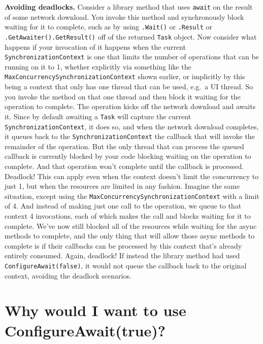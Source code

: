 \documentclass[a4paper,12pt,notitlepage,twoside,openright]{article}
\begin{document}
\textbf{Avoiding deadlocks.} Consider a library method that uses
\texttt{await} on the result of some network download. You invoke this
method and synchronously block waiting for it to complete, such as by
using \texttt{.Wait()} or \texttt{.Result} or
\texttt{.GetAwaiter().GetResult()} off of the returned \texttt{Task}
object. Now consider what happens if your invocation of it happens when
the current \texttt{SynchronizationContext} is one that limits the
number of operations that can be running on it to 1, whether explicitly
via something like the \texttt{MaxConcurrencySynchronizationContext}
shown earlier, or implicitly by this being a context that only has one
thread that can be used, e.g.~a UI thread. So you invoke the method on
that one thread and then block it waiting for the operation to complete.
The operation kicks off the network download and awaits it. Since by
default awaiting a \texttt{Task} will capture the current
\texttt{SynchronizationContext}, it does so, and when the network
download completes, it queues back to the
\texttt{SynchronizationContext} the callback that will invoke the
remainder of the operation. But the only thread that can process the
queued callback is currently blocked by your code blocking waiting on
the operation to complete. And that operation won't complete until the
callback is processed. Deadlock! This can apply even when the context
doesn't limit the concurrency to just 1, but when the resources are
limited in any fashion. Imagine the same situation, except using the
\texttt{MaxConcurrencySynchronizationContext} with a limit of 4. And
instead of making just one call to the operation, we queue to that
context 4 invocations, each of which makes the call and blocks waiting
for it to complete. We've now still blocked all of the resources while
waiting for the async methods to complete, and the only thing that will
allow those async methods to complete is if their callbacks can be
processed by this context that's already entirely consumed. Again,
deadlock! If instead the library method had used
\texttt{ConfigureAwait(false)}, it would not queue the callback back to
the original context, avoiding the deadlock scenarios.

\hypertarget{why-would-i-want-to-use-configureawaittrue}{%
\section{Why would I want to use
ConfigureAwait(true)?}\label{why-would-i-want-to-use-configureawaittrue}}
\end{document}

